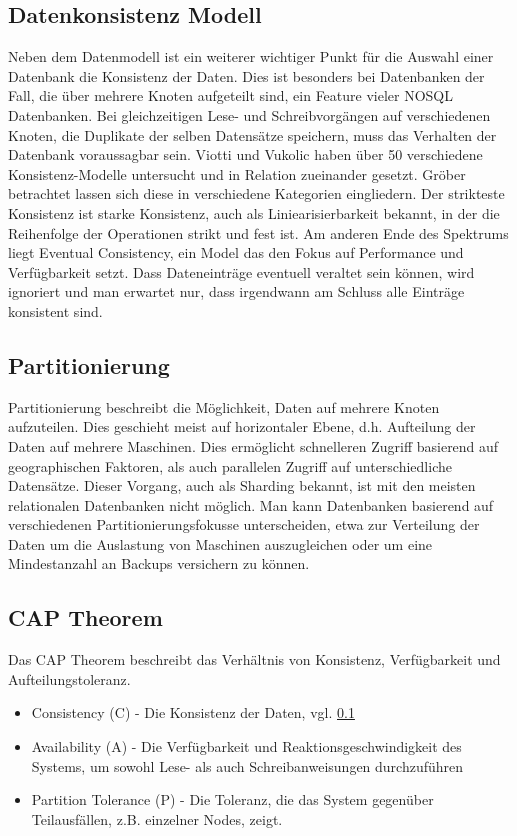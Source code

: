 \subsection{Datenkonsistenz Modell} \label{ssec:consistency}
Neben dem Datenmodell ist ein weiterer wichtiger Punkt für die Auswahl einer Datenbank die Konsistenz der Daten. Dies ist besonders bei Datenbanken der Fall, die über mehrere Knoten aufgeteilt sind, ein Feature vieler NOSQL Datenbanken. Bei gleichzeitigen Lese- und Schreibvorgängen auf verschiedenen Knoten, die Duplikate der selben Datensätze speichern, muss das Verhalten der Datenbank voraussagbar sein.
Viotti und Vukolic\cite{Viotti.01.12.2015} haben über 50 verschiedene Konsistenz-Modelle untersucht und in Relation zueinander gesetzt. Gröber betrachtet lassen sich diese in verschiedene Kategorien eingliedern.
Der strikteste Konsistenz ist starke Konsistenz, auch als Liniearisierbarkeit bekannt, in der die Reihenfolge der Operationen strikt und fest ist. Am anderen Ende des Spektrums liegt Eventual Consistency, ein Model das den Fokus auf Performance und Verfügbarkeit setzt. Dass Dateneinträge eventuell veraltet sein können, wird ignoriert und man erwartet nur, dass irgendwann am Schluss alle Einträge konsistent sind.

\subsection{Partitionierung}
Partitionierung beschreibt die Möglichkeit, Daten auf mehrere Knoten aufzuteilen. Dies geschieht meist auf horizontaler Ebene, d.h. Aufteilung der Daten auf mehrere Maschinen. Dies ermöglicht schnelleren Zugriff basierend auf geographischen Faktoren, als auch parallelen Zugriff auf unterschiedliche Datensätze. Dieser Vorgang, auch als Sharding bekannt, ist mit den meisten relationalen Datenbanken nicht möglich. Man kann Datenbanken basierend auf verschiedenen Partitionierungsfokusse unterscheiden, etwa zur Verteilung der Daten um die Auslastung von Maschinen auszugleichen oder um eine Mindestanzahl an Backups versichern zu können.

\subsection{CAP Theorem}

Das CAP Theorem beschreibt das Verhältnis von Konsistenz, Verfügbarkeit und Aufteilungstoleranz.
\begin{itemize}
\item Consistency (C) - 
Die Konsistenz der Daten, vgl. \ref{ssec:consistency}
\item Availability (A) - 
Die Verfügbarkeit und Reaktionsgeschwindigkeit des Systems, um sowohl Lese- als auch Schreibanweisungen durchzuführen
\item Partition Tolerance (P) - 
Die Toleranz, die das System gegenüber Teilausfällen, z.B. einzelner Nodes, zeigt.

\end{itemize}

